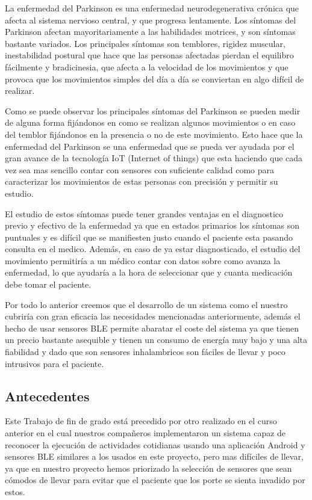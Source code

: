 La enfermedad del Parkinson es una enfermedad neurodegenerativa crónica que afecta al sistema nervioso central, y que progresa lentamente. Los síntomas del Parkinson afectan mayoritariamente a las habilidades motrices, y son síntomas bastante variados. Los principales síntomas son temblores, rigidez muscular, inestabilidad postural que hace que las personas afectadas pierdan el equilibro fácilmente y bradicinesia, que afecta a la velocidad de los movimientos y que provoca que los movimientos simples del día a día se conviertan en algo difícil de realizar.
\newline

Como se puede observar los principales síntomas del Parkinson se pueden medir de alguna forma fijándonos en como se realizan algunos movimientos o en caso del temblor fijándonos en la presencia o no de este movimiento. Esto hace que la enfermedad del Parkinson se una enfermedad que se pueda ver ayudada por el gran avance de la tecnología IoT (Internet of things) que esta haciendo que cada vez sea mas sencillo contar con sensores con suficiente calidad como para caracterizar los movimientos de estas personas con precisión y permitir su estudio.
\newline

El estudio de estos síntomas puede tener grandes ventajas en el diagnostico previo y efectivo de la enfermedad ya que en estados primarios los síntomas son puntuales y es difícil que se manifiesten justo cuando el paciente esta pasando consulta en el medico. Además, en caso de ya estar diagnosticado, el estudio del movimiento permitiría a un médico contar con datos sobre como avanza la enfermedad, lo que ayudaría a la hora de seleccionar que y cuanta medicación debe tomar el paciente.
\newline

Por todo lo anterior creemos que el desarrollo de un sistema como el nuestro cubriría con gran eficacia las necesidades mencionadas anteriormente, además el hecho de usar sensores BLE permite abaratar el coste del sistema ya que tienen un precio bastante asequible y tienen un consumo de energía muy bajo y una alta fiabilidad y dado que son sensores inhalambricos son fáciles de llevar y poco intrusivos para el paciente.

\subsection{Antecedentes}

Este Trabajo de fin de grado está precedido por otro realizado en el curso anterior \cite{TFG_Anterior}  en el cual nuestros compañeros implementaron un sistema capaz de reconocer la ejecución de actividades cotidianas usando una aplicación Android y sensores BLE similares a los usados en este proyecto, pero mas difíciles de llevar, ya que en nuestro proyecto hemos priorizado la selección de sensores que sean cómodos de llevar para evitar que el paciente que los porte se sienta invadido por estos. 
\newline

